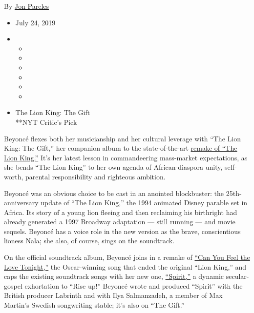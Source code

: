 By \href{https://www.nytimes.com/by/jon-pareles}{Jon Pareles}

\begin{itemize}
\item
  July 24, 2019
\item
  \begin{itemize}
  \item
  \item
  \item
  \item
  \item
  \item
  \end{itemize}
\end{itemize}

\begin{itemize}
\tightlist
\item
  The Lion King: The Gift\\
  **NYT Critic's Pick
\end{itemize}

Beyoncé flexes both her musicianship and her cultural leverage with
``The Lion King: The Gift,'' her companion album to the state-of-the-art
\href{https://www.nytimes.com/2019/07/11/movies/the-lion-king-review.html}{remake
of ``The Lion King.''} It's her latest lesson in commandeering
mass-market expectations, as she bends ``The Lion King'' to her own
agenda of African-diaspora unity, self-worth, parental responsibility
and righteous ambition.

Beyoncé was an obvious choice to be cast in an anointed blockbuster: the
25th-anniversary update of ``The Lion King,'' the 1994 animated Disney
parable set in Africa. Its story of a young lion fleeing and then
reclaiming his birthright had already generated a
\href{https://www.nytimes.com/1997/11/14/movies/theater-review-cub-comes-of-age-a-twice-told-cosmic-tale.html}{1997
Broadway adaptation} --- still running --- and movie sequels. Beyoncé
has a voice role in the new version as the brave, conscientious lioness
Nala; she also, of course, sings on the soundtrack.

On the official soundtrack album, Beyoncé joins in a remake of
\href{https://www.youtube.com/watch?v=0_USvdbYS1g}{``Can You Feel the
Love Tonight,''} the Oscar-winning song that ended the original ``Lion
King,'' and caps the existing soundtrack songs with her new one,
\href{https://www.youtube.com/watch?v=civgUOommC8}{``Spirit,''} a
dynamic secular-gospel exhortation to ``Rise up!'' Beyoncé wrote and
produced ``Spirit'' with the British producer Labrinth and with Ilya
Salmanzadeh, a member of Max Martin's Swedish songwriting stable; it's
also on ``The Gift.''

